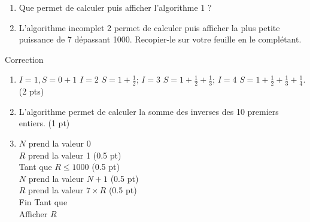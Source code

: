 \documentclass[a4paper,11pt]{article}
\theoremstyle{break}
\begin{document}
\begin{exo}
\begin{enumerate}
  \item Que permet de calculer puis afficher l'algorithme 1 ?
 
   \item L'algorithme incomplet 2 permet de calculer puis afficher
   la plus petite puissance de 7 dépassant 1000.
   Recopier-le sur votre feuille en le complétant.
 
  \end{enumerate}

\begin{correction}

Correction
\begin{enumerate}

\item $I=1,S=0+1$ $I=2$ $S=1+\frac{1}{2}$; $I=3$ $S=1+\frac{1}{2}+\frac{1}{3}$; 
$I=4$ $S=1+\frac{1}{2}+\frac{1}{3}+\frac{1}{4}$. (2 pts)
  
 \item L'algorithme permet de calculer la somme des inverses des 10 premiers entiers. (1 pt)
 
 \item 
 
 $N$ prend la valeur 0\\
   
   $R$ prend la valeur 1 (0.5 pt)\\
   
   Tant que $R \leq 1000$ (0.5 pt)\\
   
   $N$ prend la valeur $N+1$ (0.5 pt)\\
   
   $R$ prend la valeur $7 \times R$ (0.5 pt)\\ 
   
   Fin Tant que \\
   
   Afficher $R$
 
\end{enumerate}

\end{correction}

\end{exo}
 
\end{document}
